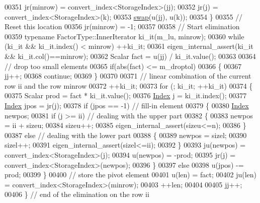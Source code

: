\begin{DoxyCode}
00351         jr(minrow) = convert\_index<StorageIndex>(jj);
00352         jr(j) = convert\_index<StorageIndex>(k);
00353         \hyperlink{endian_8c_a3ca5ecd34b04d6a243c054ac3a57f68d}{swap}(u(jj), u(k));
00354       \}
00355       \textcolor{comment}{// Reset this location}
00356       jr(minrow) = -1;
00357 
00358       \textcolor{comment}{// Start elimination}
00359       \textcolor{keyword}{typename} FactorType::InnerIterator ki\_it(m\_lu, minrow);
00360       \textcolor{keywordflow}{while} (ki\_it && ki\_it.index() < minrow) ++ki\_it;
00361       eigen\_internal\_assert(ki\_it && ki\_it.col()==minrow);
00362       Scalar fact = u(jj) / ki\_it.value();
00363 
00364       \textcolor{comment}{// drop too small elements}
00365       \textcolor{keywordflow}{if}(abs(fact) <= m\_droptol)
00366       \{
00367         jj++;
00368         \textcolor{keywordflow}{continue};
00369       \}
00370 
00371       \textcolor{comment}{// linear combination of the current row ii and the row minrow}
00372       ++ki\_it;
00373       \textcolor{keywordflow}{for} (; ki\_it; ++ki\_it)
00374       \{
00375         Scalar prod = fact * ki\_it.value();
00376         \hyperlink{namespace_eigen_a62e77e0933482dafde8fe197d9a2cfde}{Index} j     = ki\_it.index();
00377         \hyperlink{namespace_eigen_a62e77e0933482dafde8fe197d9a2cfde}{Index} jpos  = jr(j);
00378         \textcolor{keywordflow}{if} (jpos == -1) \textcolor{comment}{// fill-in element}
00379         \{
00380           \hyperlink{namespace_eigen_a62e77e0933482dafde8fe197d9a2cfde}{Index} newpos;
00381           \textcolor{keywordflow}{if} (j >= ii) \textcolor{comment}{// dealing with the upper part}
00382           \{
00383             newpos = ii + sizeu;
00384             sizeu++;
00385             eigen\_internal\_assert(sizeu<=n);
00386           \}
00387           \textcolor{keywordflow}{else} \textcolor{comment}{// dealing with the lower part}
00388           \{
00389             newpos = sizel;
00390             sizel++;
00391             eigen\_internal\_assert(sizel<=ii);
00392           \}
00393           ju(newpos) = convert\_index<StorageIndex>(j);
00394           u(newpos) = -prod;
00395           jr(j) = convert\_index<StorageIndex>(newpos);
00396         \}
00397         \textcolor{keywordflow}{else}
00398           u(jpos) -= prod;
00399       \}
00400       \textcolor{comment}{// store the pivot element}
00401       u(len)  = fact;
00402       ju(len) = convert\_index<StorageIndex>(minrow);
00403       ++len;
00404 
00405       jj++;
00406     \} \textcolor{comment}{// end of the elimination on the row ii}

\end{DoxyCode}
